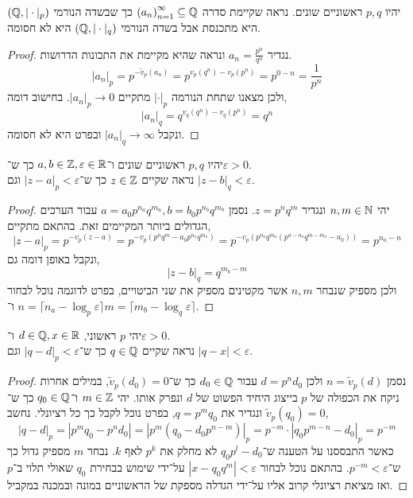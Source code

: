 \question{}
יהיו $p, q$ ראשוניים שונים.
נראה שקיימת סדרה ${(a_n)}_{n = 1}^{\infty} \subseteq \mathbb{Q}$ כך שבשדה הנורמי $(\mathbb{Q}, | \cdot |_p)$ היא מתכנסת אבל בשדה הנורמי $(\mathbb{Q}, | \cdot |_q)$ היא לא חסומה.
\begin{proof}
	נגדיר $a_n = \frac{p^n}{q^n}$ ונראה שהיא מקיימת את התכונות הדרושות.
	\[
		| a_n |_p
		= p^{-\tilde{v}_p(a_n)}
		= p^{v_p(q^n) - v_p(p^n)}
		= p^{0 - n}
		= \frac{1}{p^n}
	\]
	ולכן מצאנו שתחת הנורמה $| \cdot |_p$ מתקיים $| a_n |_p \to 0$.
	בחישוב דומה,
	\[
		| a_n |_q
		= q^{v_q(q^n) - v_q(p^n)}
		= q^n
	\]
	ונקבל $| a_n |_q \to \infty$ ובפרט היא לא חסומה.
\end{proof}

\question{}
יהיו $p, q$ ראשוניים שונים ו־$a, b \in \mathbb{Z}, \varepsilon \in \mathbb{R}$ כך ש־$\varepsilon > 0$. \\
נראה שקיים $z \in \mathbb{Z}$ כך ש־$|z - a|_p < \varepsilon$ וגם $|z - b|_q < \varepsilon$.
\begin{proof}
	יהי $n, m \in \mathbb{N}$ ונגדיר $z = p^n q^m$.
	נסמן $a = a_0 p^{n_a} q^{m_a}, b = b_0 p^{n_b} q^{m_b}$ עבור הערכים הגדולים ביותר המקיימים זאת.
	בהתאם מתקיים,
	\[
		|z - a|_p
		= p^{-v_p(z - a)}
		= p^{-v_p(p^n q^m - a_0 p^{n_a} q^{m_a})}
		= p^{-v_p(p^{n_a} q^{m_a} (p^{n - n_a} q^{m - m_a} - a_0))}
		= p^{n_a - n}
	\]
	ונקבל באופן דומה גם,
	\[
		|z - b|_q
		= q^{m_b - m}
	\]
	ולכן מספיק שנבחר $n, m$ אשר מקטינים מספיק את שני הביטויים, בפרט לדוגמה נוכל לבחור $n = \lceil n_a - \log_p \varepsilon \rceil$ ו־$m = \lceil m_b - \log_q \varepsilon \rceil$.
\end{proof}

\question{}
יהי $p$ ראשוני, $d \in \mathbb{Q}, x \in \mathbb{R}$ ו־$\varepsilon > 0$. \\
נראה שקיים $q \in \mathbb{Q}$ כך ש־$|q - d|_p < \varepsilon$ וגם $|q - x| < \varepsilon$.
\begin{proof}
	נסמן $n = \tilde{v}_p(d)$ ולכן $d = p^n d_0$ עבור $d_0 \in \mathbb{Q}$ כך ש־$\tilde{v}_p(d_0) = 0$, במילים אחרות ניקח את הכפולה של $p$ בייצוג היחיד הפשוט של $d$ ונפרק אותו.
	יהי $m \in \mathbb{Z}$ ו־$q_0 \in \mathbb{Q}$ כך ש־$\tilde{v}_p(q_0) = 0$ ונגדיר את $q = p^m q_0$, בפרט נוכל לקבל כך כל רציונלי.
	נחשב,
	\[
		|q - d|_p
		= |p^m q_0 - p^n d_0|
		= |p^m (q_0 - d_0 p^{n - m})|_p
		= p^{-m} \cdot |q_0 p^{m - n} - d_0|_p
		= p^{-m}
	\]
	כאשר התבססנו על הטענה ש־$q_0 p^l - d_0$ לא מחלק את $p^k$ לאף $k$.
	נבחר $m$ מספיק גדול כך ש־$p^{-m} < \varepsilon$.
	בהתאם נוכל לבחור $|x - q_0 q^m| < \varepsilon$ על־ידי שימוש בבחירת $q_0$ שאולי תלוי ב־$p$ ואז מציאת רציונלי קרוב אליו על־ידי הגדלה מספקת של הראשוניים במונה ובמכנה במקביל.
\end{proof}

